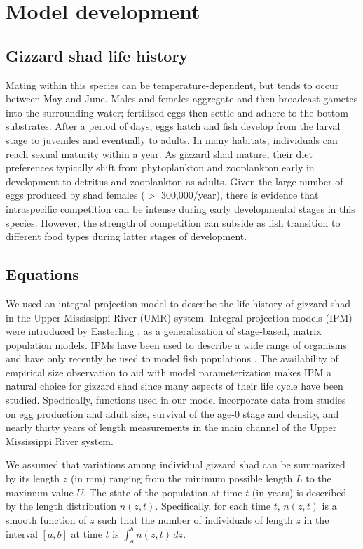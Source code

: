 \documentclass[preprint,review,12pt,authoryear]{elsarticle}
\def\ds{\displaystyle}
\begin{document}
\section{Model development}
\subsection{Gizzard shad life history}
Mating within this species can be temperature-dependent, but tends to occur between May and June. 
Males and females aggregate and then broadcast gametes into the surrounding water; fertilized eggs then settle and adhere to the bottom substrates. 
After a period of days, eggs hatch and fish develop from the larval stage to juveniles and eventually to adults. 
In many habitats, individuals can reach sexual maturity within a year. 
As gizzard shad mature, their diet preferences typically shift from phytoplankton and zooplankton early in development to detritus and zooplankton as adults. 
Given the large number of eggs produced by shad females ($>$ 300,000/year), there is evidence that intraspecific competition can be intense during early developmental stages in this species. 
However, the strength of competition can subside as fish transition to different food types during latter stages of development.   

\subsection{Equations}
We used an integral projection model to describe the life history of gizzard shad in the Upper Mississippi River (UMR) system. 
Integral projection models (IPM) were introduced by Easterling \citep{easterling2000size}, as a generalization of stage-based, matrix population models. 
IPMs have been used to describe a wide range of organisms \citep{ellner2016data, merow2014advancing, rees2014building} and have only recently be used to model fish populations \citep{erickson2017integral, liao2019dynamic, white2016fitting, pollesch2022developing}.
The availability of empirical size observation to aid with model parameterization makes IPM a natural choice for gizzard shad since many aspects of their life cycle have been studied. 
Specifically, functions used in our model incorporate data from studies on egg production and adult size,  survival of the age-0 stage and density, and nearly thirty years of length measurements in the main channel of the Upper Mississippi River system.

We assumed that variations among individual gizzard shad can be summarized by its length $z$ (in mm) ranging from the minimum possible length $L$ to the maximum value $U$. 
The state of the population at time $t$ (in years) is described by the length distribution $n(z,t)$. 
Specifically, for each time $t$, $n(z,t)$ is a smooth function of $z$ such that the number of individuals of length $z$ in the interval $[a,b]$ at time $t$ is $\ds \int_a^b n(z,t) \, dz$. 
\end{document}
